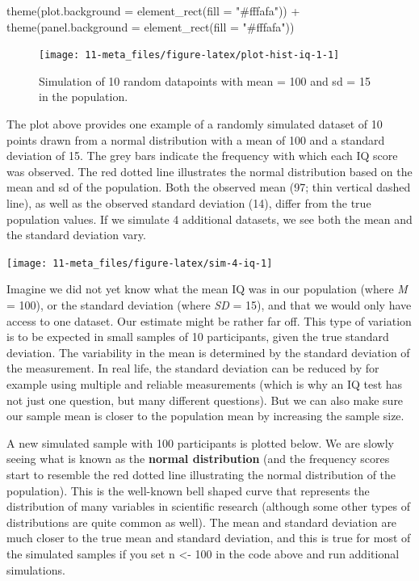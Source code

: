 \documentclass[
  oneside]{krantz}
\makeatletter
\newenvironment{Shaded}{\begin{snugshade}}{\end{snugshade}}
\newcommand{\AttributeTok}[1]{\textcolor[rgb]{0.61,0.61,0.61}{#1}}
\newcommand{\FunctionTok}[1]{\textcolor[rgb]{0,0,0}{#1}}
\newcommand{\NormalTok}[1]{#1}
\newcommand{\SpecialCharTok}[1]{\textcolor[rgb]{0,0,0}{#1}}
\newcommand{\StringTok}[1]{\textcolor[rgb]{0.5,0.5,0.5}{#1}}
\newenvironment{kframe}{%
\medskip{}
\setlength{\fboxsep}{.8em}
 \def\at@end@of@kframe{}%
 \ifinner\ifhmode%
  \def\at@end@of@kframe{\end{minipage}}%
  \begin{minipage}{\columnwidth}%
 \fi\fi%
 \def\FrameCommand##1{\hskip\@totalleftmargin \hskip-\fboxsep
 \colorbox{shadecolor}{##1}\hskip-\fboxsep
     \hskip-\linewidth \hskip-\@totalleftmargin \hskip\columnwidth}%
 \MakeFramed {\advance\hsize-\width
   \@totalleftmargin\z@ \linewidth\hsize
   \@setminipage}}%
 {\par\unskip\endMakeFramed%
 \at@end@of@kframe}
\renewenvironment{Shaded}{\begin{kframe}}{\end{kframe}}
\makeatother
\begin{document}
\begin{Shaded}
\begin{Highlighting}[]
  \FunctionTok{theme}\NormalTok{(}\AttributeTok{plot.background =} \FunctionTok{element\_rect}\NormalTok{(}\AttributeTok{fill =} \StringTok{"\#fffafa"}\NormalTok{))  }\SpecialCharTok{+} 
  \FunctionTok{theme}\NormalTok{(}\AttributeTok{panel.background =} \FunctionTok{element\_rect}\NormalTok{(}\AttributeTok{fill =} \StringTok{"\#fffafa"}\NormalTok{))}
\end{Highlighting}
\end{Shaded}

\begin{figure}

{\centering \texttt{[image: 11-meta\_files/figure-latex/plot-hist-iq-1-1]} 

}

\caption{Simulation of 10 random datapoints with mean = 100 and sd = 15 in the population.}\label{fig:plot-hist-iq-1}
\end{figure}

The plot above provides one example of a randomly simulated dataset of 10 points drawn from a normal distribution with a mean of 100 and a standard deviation of 15. The grey bars indicate the frequency with which each IQ score was observed. The red dotted line illustrates the normal distribution based on the mean and sd of the population. Both the observed mean (97; thin vertical dashed line), as well as the observed standard deviation (14), differ from the true population values. If we simulate 4 additional datasets, we see both the mean and the standard deviation vary.

\begin{center}\texttt{[image: 11-meta\_files/figure-latex/sim-4-iq-1]} \end{center}

Imagine we did not yet know what the mean IQ was in our population (where \emph{M} = 100), or the standard deviation (where \emph{SD} = 15), and that we would only have access to one dataset. Our estimate might be rather far off. This type of variation is to be expected in small samples of 10 participants, given the true standard deviation. The variability in the mean is determined by the standard deviation of the measurement. In real life, the standard deviation can be reduced by for example using multiple and reliable measurements (which is why an IQ test has not just one question, but many different questions). But we can also make sure our sample mean is closer to the population mean by increasing the sample size.

A new simulated sample with 100 participants is plotted below. We are slowly seeing what is known as the \textbf{normal distribution} (and the frequency scores start to resemble the red dotted line illustrating the normal distribution of the population). This is the well-known
bell shaped curve that represents the distribution of many variables in scientific research (although some other types of distributions are quite common as well). The mean and standard deviation are much closer to the true mean and standard deviation, and this is true for most of the simulated samples if you set n \textless- 100 in the code above and run additional simulations.
\end{document}

